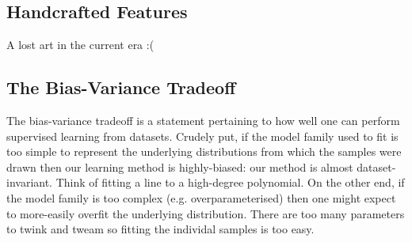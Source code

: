 \documentclass[11pt]{article}
\begin{document}
\subsection{Handcrafted Features}
A lost art in the current era :(

\subsection{The Bias-Variance Tradeoff}
The bias-variance tradeoff is a statement pertaining to how well one can perform supervised learning from datasets. Crudely put, if the model family used to fit is too simple to represent the underlying distributions from which the samples were drawn then our learning method is highly-biased: our method is almost dataset-invariant. Think of fitting a line to a high-degree polynomial. On the other end, if the model family is too complex (e.g. overparameterised) then one might expect to more-easily overfit the underlying distribution. There are too many parameters to twink and tweam so fitting the individal samples is too easy.
\end{document}
